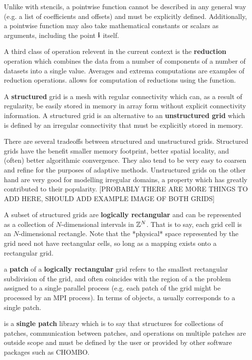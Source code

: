 \documentclass[12pt,a4paper]{article}
\begin{document}
Unlike with stencils, a pointwise function cannot be described in any general way (e.g. a list of coefficients and offsets) and must be explicitly defined. Additionally, a pointwise function may also take mathematical constants or scalars as arguments, including the point $\mathbf{i}$ itself. 

A third class of operation relevent in the current context is the \textbf{reduction} operation which combines the data from a number of components of a number of datasets into a single value. Averages and extrema computations are examples of reduction operations. \libname allows for computation of reductions using the  function. 

A \textbf{structured} grid is a mesh with regular connectivity which can, as a result of regularity, be easily stored in memory in array form without explicit connectivity information.  A structured grid is an alternative to an \textbf{unstructured grid} which is defined by an irregular connectivity that must be explicitly stored in memory.

There are several tradeoffs between structured and unstructured grids. Structured grids have the benefit smaller memory footprint, better spatial locality, and (often) better algorithmic convergence. They also tend to be very easy to coarsen and refine for the purposes of adaptive methods. Unstructured grids on the other hand are very good for modelling irregular domains, a property which has greatly contributed to their popularity. [PROBABLY THERE ARE MORE THINGS TO ADD HERE, SHOULD ADD EXAMPLE IMAGE OF BOTH GRIDS]

A subset of structured grids are \textbf{logically rectangular} and can be represented as a collection of $N$-dimensional intervals in $\mathbb{Z}^N$. That is to say, each grid cell is an $N$-dimensional rectangle. Note that the *physical* space represented by the grid need not have rectangular cells, so long as a mapping exists onto a rectangular grid.

a \textbf{patch} of a \textbf{logically rectangular} grid refers to the smallest rectangular subdivision of the grid, and often coincides with the region of a the problem assigned to a single parallel process (e.g. each patch of the grid might be processed by an MPI process). In terms of \libname objects, a  usually corresponds to a single patch.

\libname is a \textbf{single patch} library which is to say that structures for collections of patches, communication between patches, and operations on multiple patches are outside scope and must be defined by the user or provided by other software packages such as CHOMBO.  
\end{document}
